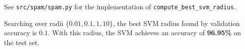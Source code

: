 \begin{answer}
See \texttt{src/spam/spam.py} for the implementation of \texttt{compute\_best\_svm\_radius}.

Searching over radii $\{0.01, 0.1, 1, 10\}$, the best SVM radius found by validation accuracy is $\boxed{0.1}$. With this radius, the SVM achieves an accuracy of \textbf{96.95\%} on the test set.
\end{answer}
